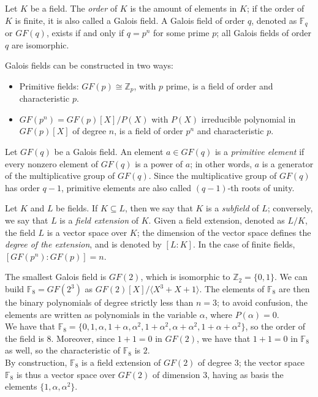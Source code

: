 \begin{definition}[Order]
    Let $K$ be a field. The \emph{order} of $K$ is the amount of elements in $K$; if the order of $K$ is finite, it is also called a Galois field.
    A Galois field of order $q$, denoted as $\mathds{F}_q$ or $GF(q)$, exists if and only if $q=p^n$ for some prime $p$; all Galois fields of order $q$ are isomorphic.
\end{definition}
Galois fields can be constructed in two ways:
\begin{itemize}
    \item Primitive fields: $GF(p) \cong \mathds{Z}_p$, with $p$ prime, is a field of order and characteristic $p$.
    \item $GF(p^n) = GF(p)[X]/P(X)$ with $P(X)$ irreducible polynomial in $GF(p)[X]$ of degree $n$,
        is a field of order $p^n$ and characteristic $p$.
\end{itemize}

\begin{definition}
    Let $GF(q)$ be a Galois field. An element $a \in GF(q)$ is a \emph{primitive element} if every nonzero element of $GF(q)$ is a power of $a$;
    in other words, $a$ is a generator of the multiplicative group of $GF(q)$. Since the multiplicative group of $GF(q)$ has order $q-1$,
    primitive elements are also called $(q-1)$-th roots of unity.
\end{definition}

\begin{definition}
    Let $K$ and $L$ be fields. If $K \subseteq L$, then we say that $K$ is a \emph{subfield} of $L$; conversely, 
    we say that $L$ is a \emph{field extension} of $K$.
    Given a field extension, denoted as $L/K$, the field $L$ is a vector space over $K$; the dimension of the vector space
    defines the \emph{degree of the extension}, and is denoted by $[L:K]$. In the case of finite fields, 
    $[GF(p^n):GF(p)] = n$.
\end{definition}

\begin{example}
    The smallest Galois field is $GF(2)$, which is isomorphic to $\mathds{Z}_2 = \{0,1\}$.
    We can build $\mathds{F}_8 = GF(2^3)$ as $GF(2)[X]/\langle X^3+X+1\rangle$.
    The elements of $\mathds{F}_8$ are then the binary polynomials of degree strictly less than $n=3$; to avoid confusion, 
    the elements are written as polynomials in the variable $\alpha$, where $P(\alpha) = 0$.\\
    We have that $\mathds{F}_8 = \{0, 1, \alpha, 1+\alpha, \alpha^2, 1+\alpha^2, \alpha + \alpha^2, 1+\alpha+\alpha^2\}$, so the order of the field is $8$.
    Moreover, since $1+1=0$ in $GF(2)$, we have that $1+1=0$ in $\mathds{F}_8$ as well, so the characteristic of $\mathds{F}_8$ is $2$.\\
    By construction, $\mathds{F}_8$ is a field extension of $GF(2)$ of degree $3$; the vector space $\mathds{F}_8$ is thus a vector space over $GF(2)$ of dimension $3$,
    having as basis the elements $\{1, \alpha, \alpha^2\}$.
\end{example}

